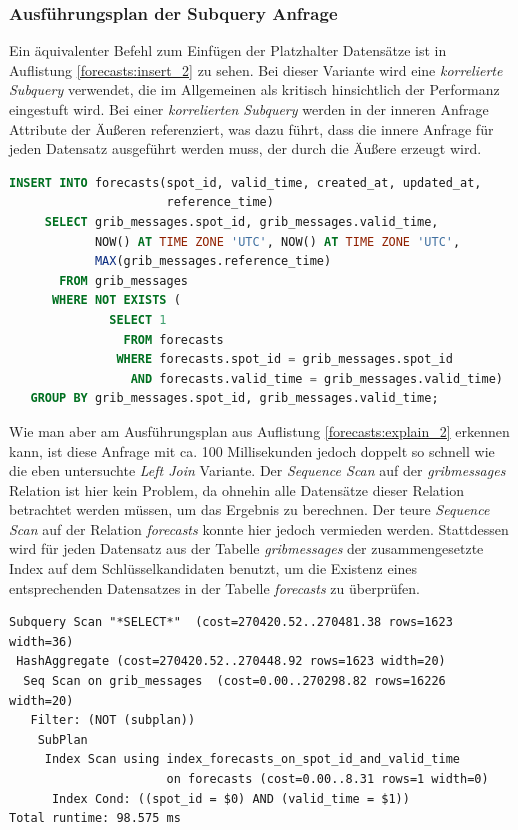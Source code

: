 \subsubsection{Ausführungsplan der Subquery Anfrage}
Ein äquivalenter Befehl zum Einfügen der Platzhalter Datensätze ist in
Auflistung \ref{forecasts:insert_2} zu sehen. Bei dieser Variante wird
eine \textit{korrelierte Subquery} verwendet, die im Allgemeinen als
kritisch hinsichtlich der Performanz eingestuft wird. Bei einer
\textit{korrelierten Subquery} werden in der inneren Anfrage Attribute
der Äußeren referenziert, was dazu führt, dass die innere Anfrage für
jeden Datensatz ausgeführt werden muss, der durch die Äußere erzeugt
wird.

\begin{lstlisting}[captionpos=b, caption=Hinzufügen von Datensätzen mittels \textit{Subquery}, label=forecasts:insert_2, language=SQL]
INSERT INTO forecasts(spot_id, valid_time, created_at, updated_at, 
                      reference_time)
     SELECT grib_messages.spot_id, grib_messages.valid_time, 
            NOW() AT TIME ZONE 'UTC', NOW() AT TIME ZONE 'UTC', 
            MAX(grib_messages.reference_time)
       FROM grib_messages
      WHERE NOT EXISTS (
              SELECT 1 
                FROM forecasts 
               WHERE forecasts.spot_id = grib_messages.spot_id
                 AND forecasts.valid_time = grib_messages.valid_time)
   GROUP BY grib_messages.spot_id, grib_messages.valid_time;
\end{lstlisting}

Wie man aber am Ausführungsplan aus Auflistung
\ref{forecasts:explain_2} erkennen kann, ist diese Anfrage mit ca. 100
Millisekunden jedoch doppelt so schnell wie die eben untersuchte
\textit{Left Join} Variante. Der \textit{Sequence Scan} auf der
\textit{grib\textunderscore messages} Relation ist hier kein Problem,
da ohnehin alle Datensätze dieser Relation betrachtet werden müssen,
um das Ergebnis zu berechnen. Der teure \textit{Sequence Scan} auf der
Relation \textit{forecasts} konnte hier jedoch vermieden
werden. Stattdessen wird für jeden Datensatz aus der Tabelle
\textit{grib\textunderscore messages} der zusammengesetzte Index auf
dem Schlüsselkandidaten benutzt, um die Existenz eines entsprechenden
Datensatzes in der Tabelle \textit{forecasts} zu überprüfen.

\begin{lstlisting}[captionpos=b, caption=Ausführungsplan der \textit{Subquery}, label=forecasts:explain_2]
Subquery Scan "*SELECT*"  (cost=270420.52..270481.38 rows=1623 width=36)
 HashAggregate (cost=270420.52..270448.92 rows=1623 width=20)
  Seq Scan on grib_messages  (cost=0.00..270298.82 rows=16226 width=20)
   Filter: (NOT (subplan))
    SubPlan
     Index Scan using index_forecasts_on_spot_id_and_valid_time 
                      on forecasts (cost=0.00..8.31 rows=1 width=0)
      Index Cond: ((spot_id = $0) AND (valid_time = $1))
Total runtime: 98.575 ms
\end{lstlisting}


